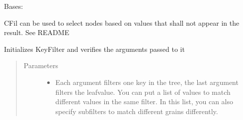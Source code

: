 \documentclass[a4paper,10pt,english]{sphinxmanual}
\begin{document}
\begin{fulllineitems}
\label{\detokenize{fagus.filters:fagus.filters.CFil}}
\pysigstartsignatures
{}
\pysigstopsignatures
\sphinxAtStartPar
Bases: {\hyperref[\detokenize{fagus.filters:fagus.filters.KFil}]{}}

\sphinxAtStartPar
CFil \sphinxhyphen{} can be used to select nodes based on values that shall not appear in the result. See README

\begin{fulllineitems}
\label{\detokenize{fagus.filters:fagus.filters.CFil.__init__}}
\pysigstartsignatures
{}
\pysigstopsignatures
\sphinxAtStartPar
Initializes KeyFilter and verifies the arguments passed to it
\begin{quote}\begin{description}
\item[{Parameters}] \leavevmode\begin{itemize}
\item {}
\sphinxAtStartPar
{} \textendash{} Each argument filters one key in the tree, the last argument filters the leaf\sphinxhyphen{}value. You can
put a list of values to match different values in the same filter. In this list, you can also specify
subfilters to match different grains differently.


\end{itemize}
\end{description}
\end{quote}
\end{fulllineitems}
\end{fulllineitems}
\end{document}
